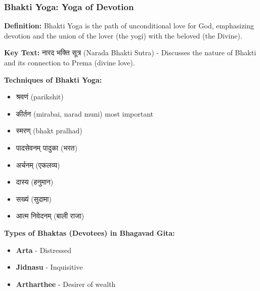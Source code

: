 \begin{frame}[fragile]\frametitle{Bhakti Yoga: Yoga of Devotion}
    \textbf{Definition:} Bhakti Yoga is the path of unconditional love for God, emphasizing devotion and the union of the lover (the yogi) with the beloved (the Divine).

    
    \textbf{Key Text:} नारद भक्ति सूत्र (Narada Bhakti Sutra) - Discusses the nature of Bhakti and its connection to Prema (divine love).

    
    \textbf{Techniques of Bhakti Yoga:}
    \begin{itemize}
        \item श्रवणं (parikshit)
        \item कीर्तन (mirabai, narad muni) most important
        \item स्मरण् (bhakt pralhad)
        \item पादसेवनम् पादुका (भरत)
        \item अर्चनम् (एकलव्य)
        \item दास्य (हनुमान)
        \item सख्यं (सुदामा)
        \item आत्म निवेदनम् (बाली राजा)

    \end{itemize}

    
    \textbf{Types of Bhaktas (Devotees) in Bhagavad Gita:}
    \begin{itemize}
        \item \textbf{Arta} - Distressed
        \item \textbf{Jidnasu} - Inquisitive
        \item \textbf{Artharthee} - Desirer of wealth
    \end{itemize}
\end{frame}


